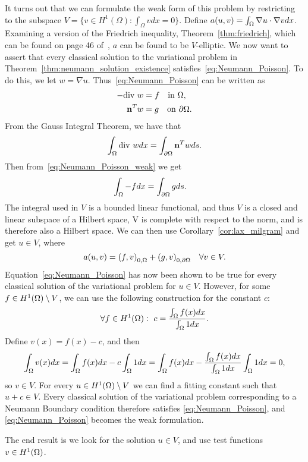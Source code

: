 It turns out that we can formulate the weak form of this problem by restricting to the subspace $V=\{v\in H^1(\Omega):\int_{\Omega}vdx=0\}$.
Define $a(u,v) = \int_\Omega \nabla u \cdot \nabla v dx$. Examining a version of 
the Friedrich inequality, Theorem~\ref{thm:friedrich}, which can be found on 
page 46 of~\cite{Braess}, $a$ can be found to be $V$-elliptic.
We now want to assert that every classical solution to the variational problem in Theorem~\ref{thm:neumann_solution_existence} satisfies~\eqref{eq:Neumann_Poisson}.
To do this, we let $w=\nabla u$. Thus~\eqref{eq:Neumann_Poisson} can be written as
\begin{align}\label{eq:Neumann_Poisson_weak}
\begin{split}
    -\text{div } w &= f \quad \text{in } \Omega, \\
    \mathbf{n}^T w &= g \quad \text{on } \partial \Omega.
\end{split}    
\end{align}
From the Gauss Integral Theorem, we have that
\[\int_{\Omega} \text{div } w dx = \int_{\partial \Omega} \mathbf{n}^T w ds.\]
Then from~\eqref{eq:Neumann_Poisson_weak} we get
\begin{align}
\begin{split}
\int_{\Omega} -f dx &= \int_{\partial \Omega} g ds.
\end{split}
\end{align}
The integral used in $V$ is a bounded linear functional, and thus 
$V$ is a closed and linear subspace of a Hilbert space, 
V is complete with respect to the norm, and is therefore also a Hilbert space. 
We can then use Corollary~\ref{cor:lax_milgram} 
 and get $u\in V$, where %
\begin{equation}\label{eq:Lax-Milgram_Neumann}
  a(u,v) = {(f,v)}_{0,\Omega} + {(g,v)}_{0,\partial \Omega} \quad \forall v\in V.  
\end{equation}
Equation~\eqref{eq:Neumann_Poisson} has now been shown to be true for 
every classical solution of the variational problem for $u\in V$. However, for some 
$f\in H^1(\Omega)\setminus V$, we can use the following construction for 
the constant $c$:
\begin{equation*}
    \forall f \in H^1(\Omega): \,\, c = \frac{\int_\Omega f(x) dx }{\int_\Omega 1 dx}.
\end{equation*}
Define $v(x) = f(x) - c$, and then 
\begin{equation*}
    \int_\Omega v(x)dx = \int_\Omega f(x) dx - c\int_\Omega 1 dx = \int_\Omega f(x) dx - \frac{\int_\Omega f(x) dx }{\int_\Omega 1 dx} \int_\Omega 1 dx = 0,
\end{equation*}
so $v \in V$. For every $u\in H^1(\Omega)\setminus V$ we can find a fitting 
constant such that $u+c \in V$. Every classical solution of the 
variational problem corresponding to a Neumann Boundary condition therefore 
satisfies \eqref{eq:Neumann_Poisson}, and \eqref{eq:Neumann_Poisson} becomes the weak formulation.

The end result is we look for the solution $u\in V$, and use test functions 
$v\in H^1(\Omega)$.